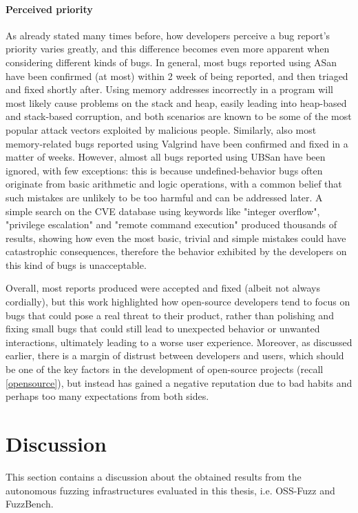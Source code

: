 \paragraph{Perceived priority} As already stated many times before, how developers perceive a bug report's priority varies greatly, and this difference becomes even more apparent when considering different kinds of bugs. In general, most bugs reported using ASan have been confirmed (at most) within 2 week of being reported, and then triaged and fixed shortly after. Using memory addresses incorrectly in a program will most likely cause problems on the stack and heap, easily leading into heap-based and stack-based corruption, and both scenarios are known to be some of the most popular attack vectors exploited by malicious people. Similarly, also most memory-related bugs reported using Valgrind have been confirmed and fixed in a matter of weeks. However, almost all bugs reported using UBSan have been ignored, with few exceptions: this is because undefined-behavior bugs often originate from basic arithmetic and logic operations, with a common belief that such mistakes are unlikely to be too harmful and can be addressed later. A simple search on the CVE database \cite{cve} using keywords like "integer overflow", "privilege escalation" and "remote command execution" produced thousands of results, showing how even the most basic, trivial and simple mistakes could have catastrophic consequences, therefore the behavior exhibited by the developers on this kind of bugs is unacceptable. 

Overall, most reports produced were accepted and fixed (albeit not always cordially), but this work highlighted how open-source developers tend to focus on bugs that could pose a real threat to their product, rather than polishing and fixing small bugs that could still lead to unexpected behavior or unwanted interactions, ultimately leading to a worse user experience. Moreover, as discussed earlier, there is a margin of distrust between developers and users, which should be one of the key factors in the development of open-source projects (recall \ref{opensource}), but instead has gained a negative reputation due to bad habits and perhaps too many expectations from both sides.












\newpage
\section{Discussion}
This section contains a discussion about the obtained results from the autonomous fuzzing infrastructures evaluated in this thesis, i.e. OSS-Fuzz and FuzzBench.

